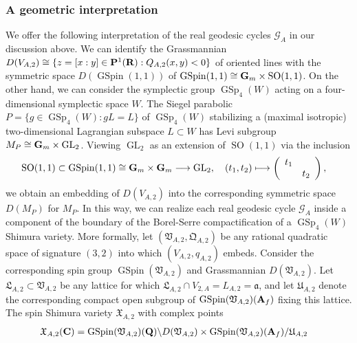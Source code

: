 \documentclass{amsart}
\theoremstyle{definition}
\begin{document}
\subsubsection{A geometric interpretation} 

We offer the following interpretation of the real geodesic cycles $\mathcal{G}_A$ in our discussion above.
We can identify the Grassmannian $D(V_{A, 2}) \cong \lbrace z = [x:y] \in {\bf{P}}^1({\bf{R}}): Q_{A, 2}(x, y) <0 \rbrace$ of oriented lines
with the symmetric space $D(\operatorname{GSpin}(1,1))$ of $\operatorname{GSpin}(1,1) \cong {\bf{G}}_m \times \operatorname{SO}(1,1)$. 
On the other hand, we can consider the symplectic group $\operatorname{GSp}_4(W)$ acting on a four-dimensional symplectic space $W$. 
The Siegel parabolic $P = \lbrace g \in \operatorname{GSp}_4(W): gL =L \rbrace$ of $\operatorname{GSp}_4(W)$ stabilizing a
(maximal isotropic) two-dimensional Lagrangian subspace $L \subset W$ has Levi subgroup 
$M_P \cong {\bf{G}}_m \times \operatorname{GL}_2$. Viewing $\operatorname{GL}_2$ as an extension of $\operatorname{SO}(1,1)$ via the inclusion 
\begin{align*} \operatorname{SO}(1,1) \subset \operatorname{GSpin}(1,1) \cong {\bf{G}}_m \times {\bf{G}}_m &\longrightarrow \operatorname{GL}_2, 
\quad (t_1, t_2) \longmapsto \left( \begin{array}{cc} t_1 & ~\\ ~& t_2 \end{array} \right), \end{align*}
we obtain an embedding of $D(V_{A,2})$ into the corresponding symmetric space $D(M_P)$ for $M_P$. 
In this way, we can realize each real geodesic cycle $\mathcal{G}_A$ inside a component of the boundary of the Borel-Serre compactification of a $\operatorname{GSp}_4(W)$ Shimura variety. 
More formally, let $(\mathfrak{V}_{A,2}, \mathfrak{Q}_{A,2})$ be any rational quadratic space of signature $(3, 2)$ into which $(V_{A, 2}, q_{A,2})$ embeds.
Consider the corresponding spin group $\operatorname{GSpin}(\mathfrak{V}_{A, 2})$ and Grassmannian $D(\mathfrak{V}_{A, 2})$. 
Let $\mathfrak{L}_{A, 2} \subset \mathfrak{V}_{A, 2}$ be any lattice for which $\mathfrak{L}_{A, 2} \cap V_{2, A} = L_{A,2} = \mathfrak{a}$, 
and let $\mathfrak{U}_{A, 2}$ denote the corresponding compact open subgroup of $\operatorname{GSpin}(\mathfrak{V}_{A, 2})({\bf{A}}_f)$ fixing this lattice.
The spin Shimura variety $\mathfrak{X}_{A, 2}$ with complex points 
\begin{align*} \mathfrak{X}_{A, 2}({\bf{C}}) &=\operatorname{GSpin}(\mathfrak{V}_{A, 2})({\bf{Q}}) \backslash D(\mathfrak{V}_{A, 2}) 
\times \operatorname{GSpin}(\mathfrak{V}_{A, 2})({\bf{A}}_f)/ \mathfrak{U}_{A, 2} \end{align*}
\end{document}
